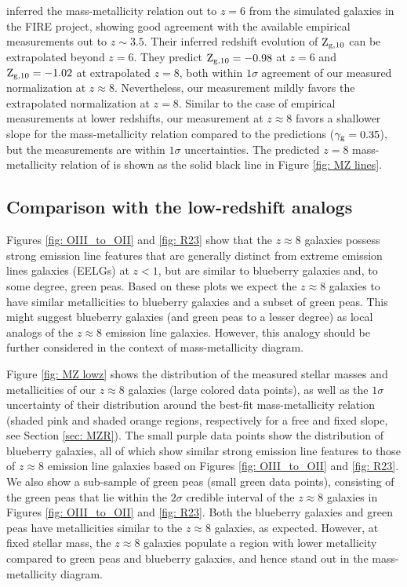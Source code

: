 \documentclass[twocolumn]{aastex631}
\begin{document}
\cite{ma+2016} inferred the mass-metallicity relation out to $z = 6$ from the simulated galaxies in the FIRE project, showing good agreement with the available empirical measurements out to $z \sim 3.5$. Their inferred redshift evolution of $\textnormal{Z}_{\textnormal{\scriptsize g,10}}$ can be extrapolated beyond $z = 6$. They predict $\textnormal{Z}_{\textnormal{\scriptsize g,10}} = -0.98$ at $z = 6$ and $\textnormal{Z}_{\textnormal{\scriptsize g,10}} = -1.02$ at extrapolated $z = 8$, both within $1\sigma$ agreement of our measured normalization at $z \approx 8$. Nevertheless, our measurement mildly favors the extrapolated normalization at $z = 8$. Similar to the case of empirical measurements at lower redshifts, our measurement at $z \approx 8$ favors a shallower slope for the mass-metallicity relation compared to the \cite{ma+2016} predictions ($\gamma_{\textnormal{\scriptsize g}} = 0.35$), but the measurements are within $1\sigma$ uncertainties. The predicted $z = 8$ mass-metallicity relation of \cite{ma+2016} is shown as the solid black line in Figure \ref{fig: MZ lines}.

\subsection{Comparison with the low-redshift analogs}

Figures \ref{fig: OIII_to_OII} and \ref{fig: R23} show that the $z \approx 8$ galaxies possess strong emission line features that are generally distinct from extreme emission lines galaxies (EELGs) at $z < 1$, but are similar to blueberry galaxies and, to some degree, green peas. Based on these plots we expect the $z \approx 8$ galaxies to have similar metallicities to blueberry galaxies and a subset of green peas. This might suggest blueberry galaxies (and green peas to a lesser degree) as local analogs of the $z \approx 8$ emission line galaxies. However, this analogy should be further considered in the context of mass-metallicity diagram.

Figure \ref{fig: MZ lowz} shows the distribution of the measured stellar masses and metallicities of our $z \approx 8$ galaxies (large colored data points), as well as the $1\sigma$ uncertainty of their distribution around the best-fit mass-metallicity relation (shaded pink and shaded orange regions, respectively for a free and fixed slope, see Section \ref{sec: MZR}). The small purple data points show the distribution of blueberry galaxies, all of which show similar strong emission line features to those of $z \approx 8$ emission line galaxies based on Figures \ref{fig: OIII_to_OII} and \ref{fig: R23}. We also show a sub-sample of green peas (small green data points), consisting of the green peas that lie within the $2\sigma$ credible interval of the $z \approx 8$ galaxies in Figures \ref{fig: OIII_to_OII} and \ref{fig: R23}. Both the blueberry galaxies and green peas have metallicities similar to the $z \approx 8$ galaxies, as expected. However, at fixed stellar mass, the $z \approx 8$ galaxies populate a region with lower metallicity compared to green peas and blueberry galaxies, and hence stand out in the mass-metallicity diagram.
\end{document}
